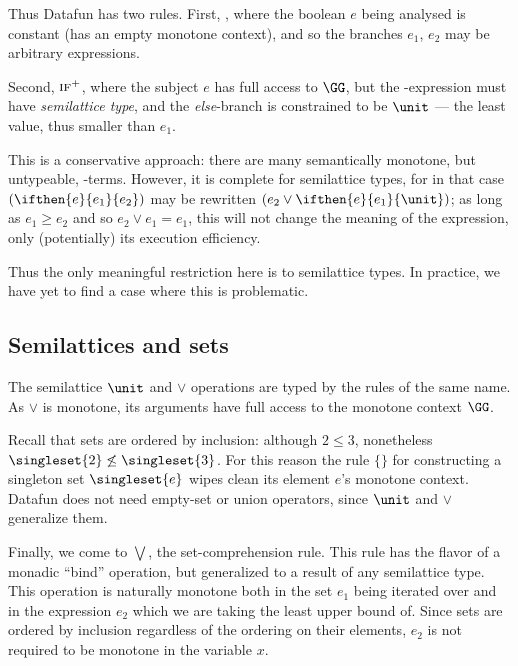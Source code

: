 Thus Datafun has two  rules. First, , where the boolean $e$ being
analysed is constant (has an empty monotone context), and so the branches $e_1$,
$e_2$ may be arbitrary expressions.

Second, $\textsc{if}^+$, where the subject $e$ has full access to $\GG$, but the
-expression must have \emph{semilattice type}, and the \emph{else}-branch
is constrained to be $\unit$ --- the least value, thus smaller than $e_1$.

This is a conservative approach: there are many semantically monotone, but
untypeable, -terms. However, it is complete for semilattice types, for in
that case $(\ifthen{e}{e_1}{e_2})$ may be rewritten $(e_2 \vee
\ifthen{e}{e_1}{\unit})$; as long as $e_1 \ge e_2$ and so $e_2 \vee e_1 = e_1$,
this will not change the meaning of the expression, only (potentially) its
execution efficiency.

Thus the only meaningful restriction here is to semilattice types. In practice,
we have yet to find a case where this is problematic.


\subsection{Semilattices and sets}
The semilattice $\unit$ and $\vee$ operations are typed by the rules of the same
name. As $\vee$ is monotone, its arguments have full access to the monotone
context $\GG$.

Recall that sets are ordered by inclusion: although $2 \le 3$, nonetheless
$\singleset{2} \not\le \singleset{3}$. For this reason the rule $\{\}$ for
constructing a singleton set $\singleset{e}$ wipes clean its element $e$'s
monotone context. Datafun does not need empty-set or union operators, since
$\unit$ and $\vee$ generalize them.

Finally, we come to $\bigvee$, the set-comprehension rule. This rule has the
flavor of a monadic ``bind'' operation, but generalized to a result of any
semilattice type. This operation is naturally monotone both in the set $e_1$
being iterated over and in the expression $e_2$ which we are taking the least
upper bound of. Since sets are ordered by inclusion regardless of the ordering
on their elements, $e_2$ is not required to be monotone in the variable $x$.

